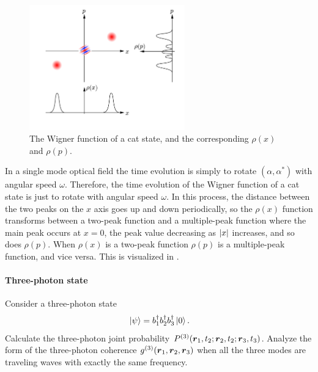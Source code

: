 \documentclass[hyperref, a4paper]{article}
\begin{document}
\begin{figure}
    \centering
    \includegraphics[width=0.6\textwidth]{cat-state.png}
    \caption{The Wigner function of a cat state, and the corresponding $\rho(x)$ and $\rho(p)$.}
    \label{fig:cat-state}
\end{figure}

In a single mode optical field the time evolution is simply to rotate $(\alpha, \alpha^*)$ with angular speed $\omega$.
Therefore, the time evolution of the Wigner function of a cat state is just to rotate  with angular speed $\omega$.
In this process, the distance between the two peaks on the $x$ axis goes up and down periodically, so the $\rho(x)$ function transforms between a two-peak function and a multiple-peak function where the main peak occurs at $x=0$, the peak value decreasing as $\abs{x}$ increases, and so does $\rho(p)$.
When $\rho(x)$ is a two-peak function $\rho(p)$ is a multiple-peak function, and vice versa.
This is visualized in \cite{cat-state}. 

\paragraph{Three-photon state} Consider a three-photon state
\begin{equation}
    \ket*{\psi} = b_1^\dagger b_2^\dagger b_3^\dagger \ket*{0}.
\end{equation}
Calculate the three-photon joint probability $P^{(3)}(\vb*{r}_1, t_2; \vb*{r}_2, t_2; \vb*{r}_3, t_3)$. Analyze the form of the three-photon coherence $g^{(3)}(\vb*{r}_1, \vb*{r}_2, \vb*{r}_3)$ when all the three modes are traveling waves with exactly the same frequency.
\end{document}
